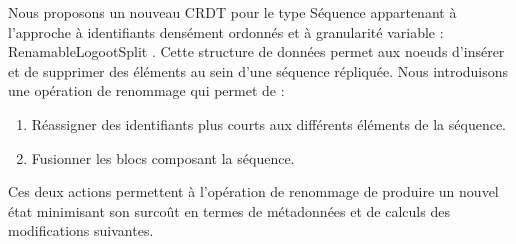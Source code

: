 Nous proposons un nouveau \ac{CRDT} pour le type Séquence appartenant à l'approche à identifiants densément ordonnés et à granularité variable : RenamableLogootSplit \cite{2020-rls-papoc-nicolas,2022-rls-tpds-nicolas}.
Cette structure de données permet aux noeuds d'insérer et de supprimer des éléments au sein d'une séquence répliquée.
Nous introduisons une opération de renommage qui permet de :
\begin{enumerate}
  \item Réassigner des identifiants plus courts aux différents éléments de la séquence.
  \item Fusionner les blocs composant la séquence.
\end{enumerate}
Ces deux actions permettent à l'opération de renommage de produire un nouvel état minimisant son surcoût en termes de métadonnées et de calculs des modifications suivantes.
